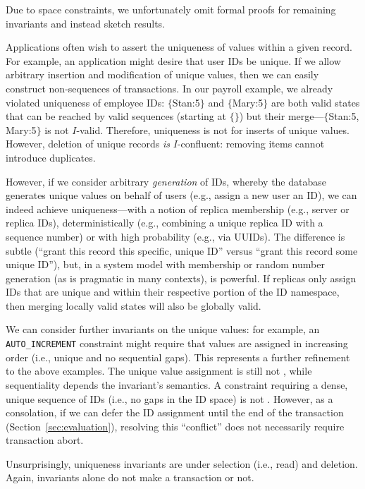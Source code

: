 Due to space constraints, we unfortunately omit formal proofs for
remaining invariants and instead sketch \iconfluence results.

 Applications often wish to assert the uniqueness
of values within a given record. For example, an application might
desire that user IDs be unique. If we allow arbitrary insertion and
modification of unique values, then we can easily construct
non-\iconfluent sequences of transactions. In our payroll example, we
already violated uniqueness of employee IDs: $\{$Stan:5$\}$ and
$\{$Mary:5$\}$ are both valid states that can be reached by valid
sequences (starting at $\{\}$) but their merge---$\{$Stan:5,
Mary:5$\}$ is not $I$-valid. Therefore, uniqueness is not \iconfluent
for inserts of unique values. However, deletion of unique records
\textit{is} $I$-confluent: removing items cannot introduce duplicates.

However, if we consider arbitrary \textit{generation} of IDs, whereby
the database generates unique values on behalf of users (e.g., assign
a new user an ID), we can indeed achieve uniqueness---with a notion of
replica membership (e.g., server or replica IDs), deterministically
(e.g., combining a unique replica ID with a sequence number) or with
high probability (e.g., via UUIDs). The difference is subtle (``grant
this record this specific, unique ID'' versus ``grant this record some
unique ID''), but, in a system model with membership or random number
generation (as is pragmatic in many contexts), is powerful. If
replicas only assign IDs that are unique and within their respective
portion of the ID namespace, then merging locally valid states will
also be globally valid.

We can consider further invariants on the unique values: for example,
an \texttt{AUTO\_INCREMENT} constraint might require that values are
assigned in increasing order (i.e., unique and no sequential
gaps). This represents a further refinement to the above examples. The
unique value assignment is still not \iconfluent, while sequentiality
depends the invariant's semantics. A constraint requiring a dense,
unique sequence of IDs (i.e., no gaps in the ID space) is not
\iconfluent. However, as a consolation, if we can defer the ID
assignment until the end of the transaction
(Section~\ref{sec:evaluation}), resolving this ``conflict'' does not
necessarily require transaction abort.

Unsurprisingly, uniqueness invariants are \iconfluent under selection
(i.e., read) and deletion. Again, invariants alone do not make a
transaction \cfree or not.

